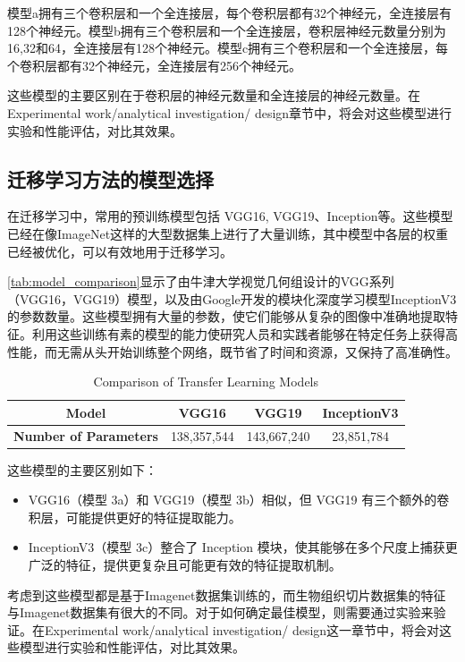 模型a拥有三个卷积层和一个全连接层，每个卷积层都有32个神经元，全连接层有128个神经元。模型b拥有三个卷积层和一个全连接层，卷积层神经元数量分别为16,32和64，全连接层有128个神经元。模型c拥有三个卷积层和一个全连接层，每个卷积层都有32个神经元，全连接层有256个神经元。

这些模型的主要区别在于卷积层的神经元数量和全连接层的神经元数量。在Experimental work/analytical investigation/ design章节中，将会对这些模型进行实验和性能评估，对比其效果。

\subsection{迁移学习方法的模型选择}

在迁移学习中，常用的预训练模型包括 VGG16, VGG19、Inception等。这些模型已经在像ImageNet这样的大型数据集上进行了大量训练，其中模型中各层的权重已经被优化，可以有效地用于迁移学习。\cite{4.30 7}

\autoref{tab:model_comparison}显示了由牛津大学视觉几何组设计的VGG系列（VGG16，VGG19）模型\cite{DL.5}，以及由Google开发的模块化深度学习模型InceptionV3 \cite{DL.6}\cite{DL.7}的参数数量。这些模型拥有大量的参数，使它们能够从复杂的图像中准确地提取特征。利用这些训练有素的模型的能力使研究人员和实践者能够在特定任务上获得高性能，而无需从头开始训练整个网络，既节省了时间和资源，又保持了高准确性。\cite{4.30 8}

\begin{table}[H]
    \centering
    \caption{Comparison of Transfer Learning Models}
    \label{tab:model_comparison}
    \begin{tabular}{cccc}
        \toprule
        \textbf{Model} & \textbf{VGG16} & \textbf{VGG19} & \textbf{InceptionV3}\\
        \midrule
        \textbf{Number of Parameters} & 138,357,544 & 143,667,240 & 23,851,784 \\
        \bottomrule
    \end{tabular}
\end{table}

这些模型的主要区别如下：

\begin{itemize}
    \item VGG16（模型 3a）和 VGG19（模型 3b）相似，但 VGG19 有三个额外的卷积层，可能提供更好的特征提取能力。
    \item InceptionV3（模型 3c）整合了 Inception 模块，使其能够在多个尺度上捕获更广泛的特征，提供更复杂且可能更有效的特征提取机制。
\end{itemize}

考虑到这些模型都是基于Imagenet数据集训练的，而生物组织切片数据集的特征与Imagenet数据集有很大的不同。对于如何确定最佳模型，则需要通过实验来验证。在Experimental work/analytical investigation/ design这一章节中，将会对这些模型进行实验和性能评估，对比其效果。






